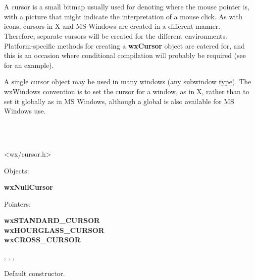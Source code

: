 \section{}\label{wxcursor}

A cursor is a small bitmap usually used for denoting where the mouse
pointer is, with a picture that might indicate the interpretation of a
mouse click. As with icons, cursors in X and MS Windows are created
in a different manner. Therefore, separate cursors will be created for the
different environments.  Platform-specific methods for creating a {\bf
wxCursor} object are catered for, and this is an occasion where
conditional compilation will probably be required (see  for
an example).

A single cursor object may be used in many windows (any subwindow type).
The wxWindows convention is to set the cursor for a window, as in X,
rather than to set it globally as in MS Windows, although a
global  is also available for MS Windows use.


\\
\\


<wx/cursor.h>


Objects:

{\bf wxNullCursor}

Pointers:

{\bf wxSTANDARD\_CURSOR\\
wxHOURGLASS\_CURSOR\\
wxCROSS\_CURSOR}


, , ,\rtfsp
{}


\label{wxcursorconstr}


Default constructor.


